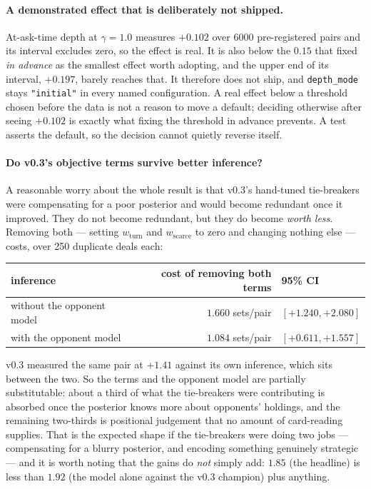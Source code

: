 \documentclass[11pt,a4paper]{article}
\begin{document}
\paragraph{A demonstrated effect that is deliberately not shipped.} At-ask-time
depth at $\gamma = 1.0$ measures $+0.102$ over $6000$ pre-registered pairs and
its interval excludes zero, so the effect is real. It is also below the $0.15$
that  fixed \emph{in advance} as the
smallest effect worth adopting, and the upper end of its interval, $+0.197$,
barely reaches that. It therefore does not ship, and \texttt{depth\_mode} stays
\texttt{"initial"} in every named configuration. A real effect below a threshold
chosen before the data is not a reason to move a default; deciding otherwise
after seeing $+0.102$ is exactly what fixing the threshold in advance prevents.
A test asserts the default, so the decision cannot quietly reverse itself.

\paragraph{Do v0.3's objective terms survive better inference?} A reasonable
worry about the whole result is that v0.3's hand-tuned tie-breakers were
compensating for a poor posterior and would become redundant once it improved.
They do not become redundant, but they do become \emph{worth less}. Removing
both --- setting $w_{\mathrm{turn}}$ and $w_{\mathrm{scarce}}$ to zero and
changing nothing else --- costs, over 250 duplicate deals each:

\begin{center}
\small
\begin{tabular}{lrl}
\toprule
inference & cost of removing both terms & 95\% CI \\
\midrule
without the opponent model & $1.660$ sets/pair & $[+1.240, +2.080]$ \\
with the opponent model    & $1.084$ sets/pair & $[+0.611, +1.557]$ \\
\bottomrule
\end{tabular}
\end{center}

v0.3 measured the same pair at $+1.41$ against its own inference, which sits
between the two. So the terms and the opponent model are partially substitutable:
about a third of what the tie-breakers were contributing is absorbed once the
posterior knows more about opponents' holdings, and the remaining two-thirds is
positional judgement that no amount of card-reading supplies. That is the
expected shape if the tie-breakers were doing two jobs --- compensating for a
blurry posterior, and encoding something genuinely strategic --- and it is worth
noting that the gains do \emph{not} simply add: $1.85$ (the headline) is less
than $1.92$ (the model alone against the v0.3 champion) plus anything.
\end{document}

